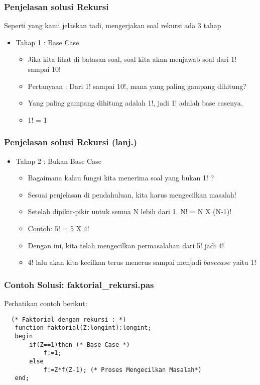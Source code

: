 \documentclass{beamer}
\begin{document}
\begin{frame}
\frametitle{Penjelasan solusi Rekursi}
Seperti yang kami jelaskan tadi, mengerjakan soal rekursi ada 3 tahap
\begin{itemize}
    \item Tahap 1 : Base Case
    \begin {itemize}
        \item Jika kita lihat di batasan soal, soal kita akan menjawab soal dari 1! sampai 10!
        \item Pertanyaan : Dari 1! sampai 10!, mana yang paling gampang dihitung?
        \item Yang paling gampang dihitung adalah 1!, jadi 1! adalah base casenya.
        \item 1! = 1
    \end {itemize}
\end{itemize}
\end{frame}

\begin{frame}
\frametitle{Penjelasan solusi Rekursi (lanj.) }
\begin{itemize}
    \item Tahap 2 : Bukan Base Case
    \begin {itemize}
        \item Bagaimana kalau fungsi kita menerima soal yang bukan 1! ?
        \item Sesuai penjelasan di pendahuluan, kita harus mengecilkan masalah!
        \item Setelah dipikir-pikir untuk semua N lebih dari 1. N! = N X (N-1)!
        \item Contoh: 5! = 5 X 4!
        \item Dengan ini, kita telah mengecilkan permasalahan dari 5! jadi 4!
        \item 4! lalu akan kita kecilkan terus menerus sampai menjadi $base case$ yaitu 1!
    \end {itemize}
\end{itemize}
\end{frame}

\begin{frame}[fragile]
\frametitle{Contoh Solusi: faktorial\_rekursi.pas}
Perhatikan contoh berikut:
\begin{lstlisting}
  (* Faktorial dengan rekursi : *)
   function faktorial(Z:longint):longint;
   begin
       if(Z==1)then (* Base Case *)
           f:=1;
       else
           f:=Z*f(Z-1); (* Proses Mengecilkan Masalah*)
   end;
\end{lstlisting}
\end{frame}
\end{document}
